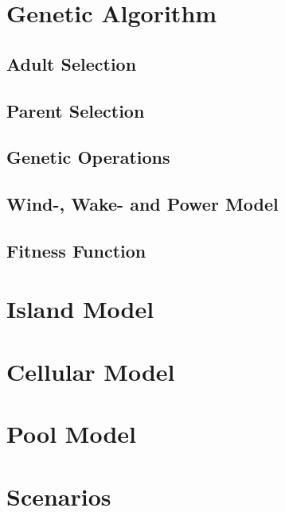 \documentclass{article}
\begin{document}
\section{Genetic Algorithm}\label{section: genetic algorithm}


\subsection{Adult Selection}\label{subsection: adult selection}


\subsection{Parent Selection}\label{subsection: parent selection}


\subsection{Genetic Operations}\label{subsection: genetic operations}


\subsection{Wind-, Wake- and Power Model}\label{subsection: wind-, wake- and power model}


\subsection{Fitness Function}\label{subsection: fitness function}


\section{Island Model}\label{section: island model}


\section{Cellular Model}\label{section: cellular model}


\section{Pool Model}\label{section: pool model}


\section{Scenarios}\label{section: scenarios}
\end{document}
